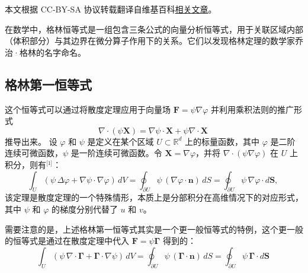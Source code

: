 
本文根据 CC-BY-SA 协议转载翻译自维基百科\href{https://en.wikipedia.org/wiki/Green\%27s_identities}{相关文章}。

在数学中，格林恒等式是一组包含三条公式的向量分析恒等式，用于关联区域内部（体积部分）与其边界在微分算子作用下的关系。它们以发现格林定理的数学家乔治·格林的名字命名。
\subsection{格林第一恒等式}
这个恒等式可以通过将散度定理应用于向量场 $\mathbf{F} = \psi \nabla \varphi$ 并利用乘积法则的推广形式
$$
\nabla \cdot (\psi \mathbf{X}) = \nabla \psi \cdot \mathbf{X} + \psi \nabla \cdot \mathbf{X}~
$$
推导出来。
设 $\varphi$ 和 $\psi$ 是定义在某个区域 $U \subset \mathbb{R}^d$ 上的标量函数，其中 $\varphi$ 是二阶连续可微函数，$\psi$ 是一阶连续可微函数。令 $\mathbf{X} = \nabla \varphi$，并将 $\nabla \cdot (\psi \nabla \varphi)$ 在 $U$ 上积分，则有\(^\text{[1]}\)：
$$
\int_U \left(\psi \,\Delta \varphi + \nabla \psi \cdot \nabla \varphi \right) \, dV
= 
\oint_{\partial U} \psi \, (\nabla \varphi \cdot \mathbf{n}) \, dS
=
\oint_{\partial U} \psi \, \nabla \varphi \cdot d\mathbf{S},~
$$
该定理是散度定理的一个特殊情形，本质上是分部积分在高维情况下的对应形式，其中 $\psi$ 和 $\varphi$ 的梯度分别代替了 $u$ 和 $v$。

需要注意的是，上述格林第一恒等式其实是一个更一般恒等式的特例，这个更一般的恒等式是通过在散度定理中代入 $\mathbf{F} = \psi \mathbf{\Gamma}$ 得到的：
$$
\int_U \left(\psi \, \nabla \cdot \mathbf{\Gamma} + \mathbf{\Gamma} \cdot \nabla \psi \right)\, dV
=
\oint_{\partial U} \psi \, (\mathbf{\Gamma} \cdot \mathbf{n}) \, dS
=
\oint_{\partial U} \psi \, \mathbf{\Gamma} \cdot d\mathbf{S}~
$$
